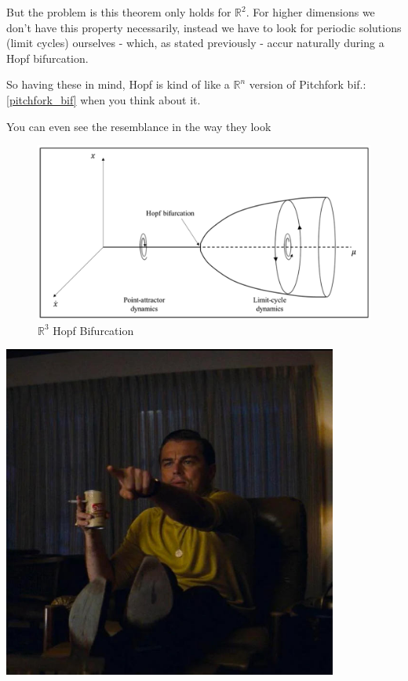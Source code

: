 But the problem is this theorem only holds for $\mathbb{R}^2$. For higher dimensions we don't have this property necessarily, instead we have to look for periodic solutions (limit cycles) ourselves - which, as stated previously - accur naturally during a Hopf bifurcation.

So having these in mind, Hopf is kind of like a $\mathbb{R}^n$ version of Pitchfork bif.: \ref{pitchfork_bif} when you think about it.

You can even see the resemblance in the way they look

\begin{figure}[H]
  \includegraphics[width=13cm]{math_pics/hopf-bif-pic.png}
  \centering
  \caption{$\mathbb{R}^3$ Hopf Bifurcation}
\end{figure}

\includegraphics[width=11cm]{math_pics/leo.jpg}

